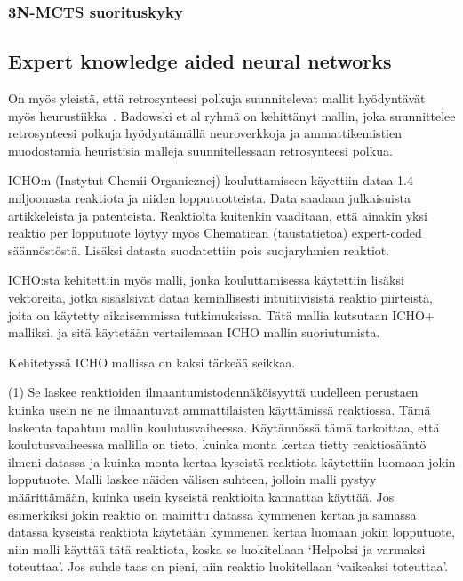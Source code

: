 \documentclass[finnish,twoside,censored,tkt,sw-line]{HYthesisML}
\begin{document}
\subsubsection{3N-MCTS suorituskyky}

\subsection{Expert knowledge aided neural networks}

On myös yleistä, että retrosynteesi polkuja  suunnitelevat mallit hyödyntävät myös heurustiikka~\cite{ExpertKnowledgeRetorsynthesis}.
Badowski et al ryhmä on kehittänyt mallin, joka suunnittelee retrosynteesi polkuja hyödyntämällä neuroverkkoja ja ammattikemistien muodostamia heuristisia malleja suunnitellessaan retrosynteesi polkua.

ICHO:n (Instytut Chemii Organicznej) kouluttamiseen käyettiin dataa 1.4 miljoonasta reaktiota ja niiden lopputuotteista.
Data saadaan julkaisuista artikkeleista ja patenteista.
Reaktiolta kuitenkin vaaditaan, että ainakin yksi reaktio per lopputuote löytyy myös Chematican (taustatietoa) expert-coded säännöstöstä.
Lisäksi datasta suodatettiin pois suojaryhmien reaktiot.

ICHO:sta kehitettiin myös malli, jonka kouluttamisessa käytettiin lisäksi vektoreita, jotka sisäslsivät dataa kemiallisesti intuitiivisistä reaktio piirteistä, joita on käytetty aikaisemmissa tutkimuksissa.
Tätä mallia kutsutaan ICHO+ malliksi, ja sitä käytetään vertailemaan ICHO mallin suoriutumista.

Kehitetyssä ICHO mallissa on kaksi tärkeää seikkaa.

(1) Se laskee reaktioiden ilmaantumistodennäköisyyttä uudelleen perustaen kuinka usein ne ne ilmaantuvat ammattilaisten käyttämissä reaktiossa.
Tämä laskenta tapahtuu mallin koulutusvaiheessa.
Käytännössä tämä tarkoittaa, että koulutusvaiheessa mallilla on tieto, kuinka monta kertaa tietty reaktiosääntö ilmeni datassa ja kuinka monta kertaa kyseistä reaktiota käytettiin luomaan jokin lopputuote.
Malli laskee näiden välisen suhteen, jolloin malli pystyy määrittämään, kuinka usein kyseistä reaktioita kannattaa käyttää.
Jos esimerkiksi jokin reaktio on mainittu datassa kymmenen kertaa ja samassa datassa kyseistä reaktiota käytetään kymmenen kertaa luomaan jokin lopputuote, niin malli käyttää tätä reaktiota, koska se luokitellaan `Helpoksi ja varmaksi toteuttaa'.
Jos suhde taas on pieni, niin reaktio luokitellaan `vaikeaksi toteuttaa'.
\end{document}
